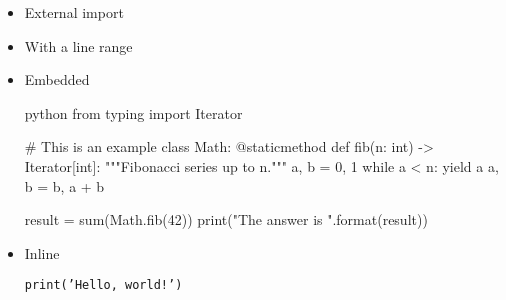 \begin{itemize}
  \item External import


  \item With a line range


  \item Embedded

  \begin{code}{python}
  from typing import Iterator

  # This is an example
  class Math:
      @staticmethod
      def fib(n: int) -> Iterator[int]:
          """Fibonacci series up to n."""
          a, b = 0, 1
          while a < n:
              yield a
              a, b = b, a + b

  result = sum(Math.fib(42))
  print("The answer is {}".format(result))
  \end{code}

  \item Inline

  \texttt{print('Hello, world!')}
\end{itemize}
